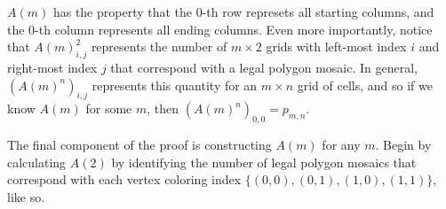 \documentclass[12pt]{article}
\theoremstyle{plain}
\theoremstyle{definition}
\theoremstyle{remark}
\theoremstyle{definition}
\newcommand{\lablnode}[3]{\node[shape=circle,draw=none,fill=none, inner sep=0pt,minimum size=5pt] (A) at ( #1 , #2 ) {#3};}
\newcommand{\lablvertex}[3]{\node[shape=circle,draw=none,fill=white, inner sep=2pt,minimum size=5pt] (A) at ( #1 , #2 ) {#3};}
\begin{document}
\begin{center}
\end{center}

$A(m)$ has the property that the $0$-th row represets all starting columns, and the $0$-th column represents all ending columns. Even more importantly, notice that $A(m)^2_{i,j}$ represents the number of $m \times 2$ grids with left-most index $i$ and right-most index $j$ that correspond with a legal polygon mosaic. In general, $(A(m)^n)_{i,j}$ represents this quantity for an $m \times n$ grid of cells, and so if we know $A(m)$ for some $m$, then $(A(m)^n)_{0,0} = p_{m,n}.$

The final component of the proof is constructing $A(m)$ for any $m$. Begin by  calculating $A(2)$ by identifying the number of legal polygon mosaics that correspond with each vertex coloring index $\{(0,0),(0,1),(1,0),(1,1)\}$, like so.
\end{document}
